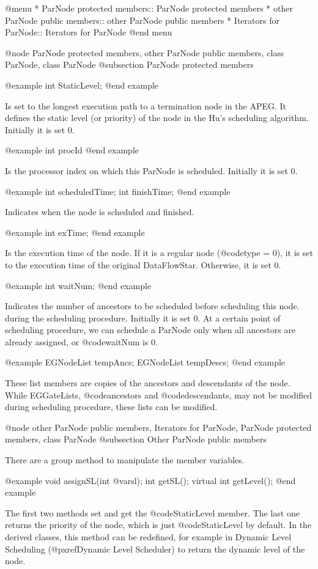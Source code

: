 @menu
* ParNode protected members::		ParNode protected members
* other ParNode public members::	other ParNode public members
* Iterators for ParNode::		Iterators for ParNode
@end menu

@node ParNode protected members, other ParNode public members, class ParNode, class ParNode
@subsection ParNode protected members

@example
int StaticLevel;
@end example

Is set to the longest execution path to a termination node in the APEG.
It defines the static level (or priority) of the node in the 
Hu's scheduling algorithm. Initially it is set 0.

@example
int procId
@end example

Is the processor index on which this ParNode is scheduled. Initially it
is set 0.

@example
int scheduledTime;
int finishTime;
@end example

Indicates when the node is scheduled and finished. 

@example
int exTime;
@end example

Is the execution time of the node. If it is a regular node (@code{type} = 0),
it is set to the execution time of the original DataFlowStar. Otherwise,
it is set 0.

@example
int waitNum;
@end example

Indicates the number of ancestors to be scheduled before scheduling this node.
during the scheduling procedure. Initially it is set 0. 
At a certain point of scheduling procedure,
we can schedule a ParNode only when all ancestors are already assigned, or
@code{waitNum} is 0.

@example
EGNodeList tempAncs;
EGNodeList tempDescs;
@end example

These list members are copies of the ancestors and descendants of the node.
While EGGateLists, @code{ancestors} and @code{descendants}, may not
be modified during scheduling procedure, these lists can be modified.

@node other ParNode public members, Iterators for ParNode, ParNode protected members, class ParNode
@subsection Other ParNode public members

There are a group method to manipulate the member variables.

@example
void assignSL(int @var{sl});
int getSL();
virtual int getLevel();
@end example

The first two methods set and get the @code{StaticLevel} member.
The last one returns the priority of the node, which is just
@code{StaticLevel} by default. In the derived classes, this method
can be redefined, for example in Dynamic Level Scheduling
(@pxref{Dynamic Level Scheduler}) to return the dynamic level of the node.


